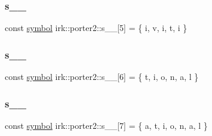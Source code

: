 \mbox{\label{namespaceirk_1_1porter2_a242aca3a4ed8390fb0038d54f20a434b}} 
\subsubsection{\texorpdfstring{s\+\_\+\_}{s\_5\_13}}
{\footnotesize\ttfamily const \mbox{\hyperlink{namespaceirk_1_1porter2_afd04c4eb58a1dabcf8f3ab2d7e9f9ed5}{symbol}} irk\+::porter2\+::s\+\_\+\_\mbox{[}5\mbox{]} = \{ \textquotesingle{}i\textquotesingle{}, \textquotesingle{}v\textquotesingle{}, \textquotesingle{}i\textquotesingle{}, \textquotesingle{}t\textquotesingle{}, \textquotesingle{}i\textquotesingle{} \}\hspace{0.3cm}{\ttfamily [static]}}

\mbox{\label{namespaceirk_1_1porter2_a54db2cccb47e743cccf64cb379b4530d}} 
\subsubsection{\texorpdfstring{s\+\_\+\_}{s\_5\_14}}
{\footnotesize\ttfamily const \mbox{\hyperlink{namespaceirk_1_1porter2_afd04c4eb58a1dabcf8f3ab2d7e9f9ed5}{symbol}} irk\+::porter2\+::s\+\_\+\_\mbox{[}6\mbox{]} = \{ \textquotesingle{}t\textquotesingle{}, \textquotesingle{}i\textquotesingle{}, \textquotesingle{}o\textquotesingle{}, \textquotesingle{}n\textquotesingle{}, \textquotesingle{}a\textquotesingle{}, \textquotesingle{}l\textquotesingle{} \}\hspace{0.3cm}{\ttfamily [static]}}

\mbox{\label{namespaceirk_1_1porter2_aace82292dbf202ced1ad9bb2ab2f0b35}} 
\subsubsection{\texorpdfstring{s\+\_\+\_}{s\_5\_15}}
{\footnotesize\ttfamily const \mbox{\hyperlink{namespaceirk_1_1porter2_afd04c4eb58a1dabcf8f3ab2d7e9f9ed5}{symbol}} irk\+::porter2\+::s\+\_\+\_\mbox{[}7\mbox{]} = \{ \textquotesingle{}a\textquotesingle{}, \textquotesingle{}t\textquotesingle{}, \textquotesingle{}i\textquotesingle{}, \textquotesingle{}o\textquotesingle{}, \textquotesingle{}n\textquotesingle{}, \textquotesingle{}a\textquotesingle{}, \textquotesingle{}l\textquotesingle{} \}\hspace{0.3cm}{\ttfamily [static]}}

